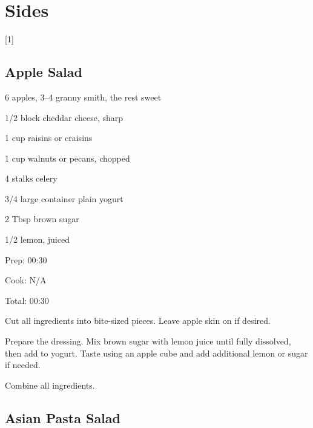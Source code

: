 \documentclass[oneside]{book}  %
\def\thisrecipe{}  %
\newcommand{\chapterrec}[1]{  %
  \newpage \def\thisrecipe{} \chapter{#1} \vspace{1.1em}
}
\newcommand{\chaptertoc}[1]{  %
  \chapterrec{#1} \vspace{-1.1em}  %
  \startcontents[chapters] \printcontents[chapters]{chapter_toc_}{1}[1]{}
}
\newcommand{\recipe}[1]{\section{#1}\def\thisrecipe{: #1}} %
\begin{document}
\chaptertoc{Sides} \label{chap:sides}
\recipe{Apple Salad} \label{recipe:apple_salad} %

\begin{IT}
  \begin{ingredients}
  \item[6] apples, 3--4 granny smith, the rest sweet
  \item[1/2 block]  cheddar cheese, sharp
  \item[1 cup] raisins or craisins
  \item[1 cup] walnuts or pecans, chopped
  \item[4 stalks] celery
  \item[3/4 large container] plain yogurt 
  \item[2 Tbsp] brown sugar
  \item[1/2] lemon, juiced
  \end{ingredients}

  \switchcolumn

  \begin{timeline}
    \item[Prep:]  00:30
    \item[Cook:]  N/A
    \item[Total:] 00:30
  \end{timeline}
\end{IT}

\begin{directions}
  \item Cut all ingredients into bite-sized pieces. Leave apple skin on if
  desired.

  \item Prepare the dressing. Mix brown sugar with lemon juice until fully
  dissolved, then add to yogurt. Taste using an apple cube and add additional
  lemon or sugar if needed.

  \item Combine all ingredients.
\end{directions}
\recipe{Asian Pasta Salad} \label{recipe:asian_pasta_salad} %
 
\end{document}
